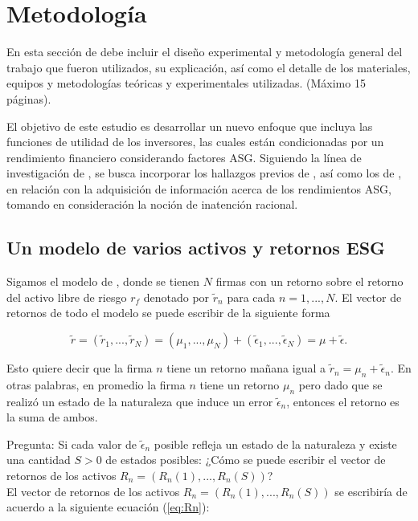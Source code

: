 
\chapter{Metodología}
\label{ch:metodo} %

{\color{blue} En esta sección de debe incluir el diseño experimental y metodología general del trabajo que fueron utilizados, su explicación, así como el detalle de los materiales, equipos y metodologías teóricas y experimentales utilizadas. (Máximo 15 páginas). }

El objetivo de este estudio es desarrollar un nuevo enfoque que incluya las funciones de utilidad de los inversores, las cuales están condicionadas por un rendimiento financiero considerando factores ASG.  Siguiendo la línea de investigación de \cite{pastor_sustainable_2021}, se busca incorporar los hallazgos previos de \cite{heinke_rational_2016}, así como los de \cite{pedersen_responsible_2021}, en relación con la adquisición de información acerca de los rendimientos ASG, tomando en consideración la noción de inatención racional.

\section{Un modelo de varios activos y retornos ESG}

Sigamos el modelo de , donde se tienen $N$ firmas con un retorno sobre el retorno del activo libre de riesgo $r_f$ denotado por $\tilde r_n$ para cada $n=1,...,N$. El vector de retornos de todo el modelo se puede escribir de la siguiente forma

$$\tilde r=(\tilde r_1,...,\tilde r_N)=(\mu_1,...,\mu_N)+(\tilde\epsilon_1,...,\tilde\epsilon_N)=\mu+\tilde\epsilon.$$

Esto quiere decir que la firma $n$ tiene un retorno mañana igual a $\tilde r_n=\mu_n+\tilde\epsilon_n$. En otras palabras, en promedio la firma $n$ tiene un retorno $\mu_n$ pero dado que se realizó un estado de la naturaleza que induce un error $\tilde\epsilon_n$, entonces el retorno es la suma de ambos.

Pregunta: Si cada valor de $\tilde\epsilon_n$ posible refleja un estado de la naturaleza y existe una cantidad $S>0$ de estados posibles: ¿Cómo se puede escribir el vector de retornos de los activos $R_n=(R_n(1),...,R_n(S))$?\\

El vector de retornos de los activos $R_n=(R_n(1),...,R_n(S))$ se escribiría de acuerdo a la siguiente ecuación (\ref{eq:Rn}):


